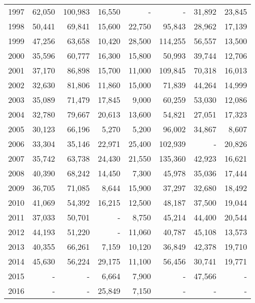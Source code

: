\begin{longtable}{lrrrrrrr}
  1997 & 62,050 & 100,983 & 16,550 & - & - & 31,892 & 23,845 \\ 
  1998 & 50,441 & 69,841 & 15,600 & 22,750 & 95,843 & 28,962 & 17,139 \\ 
  1999 & 47,256 & 63,658 & 10,420 & 28,500 & 114,255 & 56,557 & 13,500 \\ 
  2000 & 35,596 & 60,777 & 16,300 & 15,800 & 50,993 & 39,744 & 12,706 \\ 
  2001 & 37,170 & 86,898 & 15,700 & 11,000 & 109,845 & 70,318 & 16,013 \\ 
  2002 & 32,630 & 81,806 & 11,860 & 15,000 & 71,839 & 44,264 & 14,999 \\ 
  2003 & 35,089 & 71,479 & 17,845 & 9,000 & 60,259 & 53,030 & 12,086 \\ 
  2004 & 32,780 & 79,667 & 20,613 & 13,600 & 54,821 & 27,051 & 17,323 \\ 
  2005 & 30,123 & 66,196 & 5,270 & 5,200 & 96,002 & 34,867 & 8,607 \\ 
  2006 & 33,304 & 35,146 & 22,971 & 25,400 & 102,939 & - & 20,826 \\ 
  2007 & 35,742 & 63,738 & 24,430 & 21,550 & 135,360 & 42,923 & 16,621 \\ 
  2008 & 40,390 & 68,242 & 14,450 & 7,300 & 45,978 & 35,036 & 17,444 \\ 
  2009 & 36,705 & 71,085 & 8,644 & 15,900 & 37,297 & 32,680 & 18,492 \\ 
  2010 & 41,069 & 54,392 & 16,215 & 12,500 & 48,187 & 37,500 & 19,044 \\ 
  2011 & 37,033 & 50,701 & - & 8,750 & 45,214 & 44,400 & 20,544 \\ 
  2012 & 44,193 & 51,220 & - & 11,060 & 40,787 & 45,108 & 13,573 \\ 
  2013 & 40,355 & 66,261 & 7,159 & 10,120 & 36,849 & 42,378 & 19,710 \\ 
  2014 & 45,630 & 56,224 & 29,175 & 11,100 & 56,456 & 30,741 & 19,771 \\ 
  2015 & - & - & 6,664 & 7,900 & - & 47,566 & - \\ 
  2016 & - & - & 25,849 & 7,150 & - & - & - \\ 
   \hline
\hline
\end{longtable}
\endgroup
